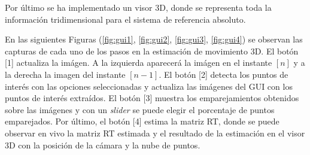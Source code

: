 Por último se ha implementado un visor 3D, donde se representa toda la información tridimensional para el sistema de referencia absoluto.

En las siguientes Figuras (\ref{fig:gui1}, \ref{fig:gui2}, \ref{fig:gui3}, \ref{fig:gui4}) se observan las capturas de cada uno de los pasos en la estimación de movimiento 3D. El botón [1] actualiza la imágen. A la izquierda aparecerá la imágen en el instante $[n]$ y a la derecha la imagen del instante $[n-1]$. El botón [2] detecta los puntos de interés con las opciones seleccionadas y actualiza las imágenes del GUI con los puntos de interés extraídos. El botón [3] muestra los emparejamientos obtenidos sobre las imágenes y con un \textit{slider} se puede elegir el porcentaje de puntos emparejados. Por último, el botón [4] estima la matriz RT, donde se puede observar en vivo la matriz RT estimada y el resultado de la estimación en el visor 3D con la posición de la cámara y la nube de puntos.

%
%
%
%
%
